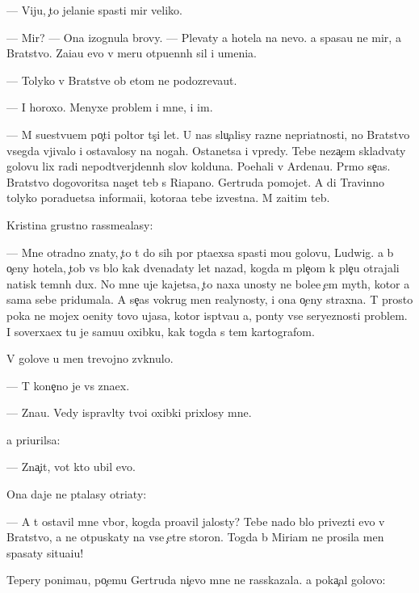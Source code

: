 \documentclass[10pt]{book}
\begin{document}
— Viju, {\c}to jelani{\y}e spasti mir veliko.

— Mir? — Ona izognula brovy. — Plevaty {\y}a hotela na nevo. {\Y}a spasa{\y}u ne mir, a Bratstvo. Za{\x}i{\x}a{\y}u {\y}evo v meru otpu{\x}enn{\yi}h sil i umeni{\y}a.

— Tolyko v Bratstve ob etom ne podozreva{\y}ut.

— I horoxo. Menyxe problem i mne, i im.

— M{\yi} su{\x}estvu{\y}em po{\c}ti poltor{\yi} t{\yi}s{\ia}{\c}i let. U nas slu{\c}alisy razn{\yi}{\y}e nepri{\y}atnosti, no Bratstvo vsegda v{\yi}jivalo i ostavalosy na nogah. Ostanetsa i vpredy. Tebe neza{\c}em sklad{\yi}vaty golovu lix radi nepodtverjdenn{\yi}h slov kolduna. Po{\y}ehali v Ardenau. Pr{\ia}mo se{\y}{\c}as. Bratstvo dogovoritsa nas{\c}et teb{\ia} s Riapano. Gertruda pomojet. A di Travinno tolyko poradu{\y}etsa informa{\q}i{\y}i, kotora{\y}a tebe izvestna. M{\yi} za{\x}itim teb{\ia}.

Kristina grustno rassme{\y}alasy:

— Mne otradno znaty, {\c}to t{\yi} do sih por p{\yi}ta{\y}exsa spasti mo{\y}u golovu, Ludwig. {\Y}a b{\yi} o{\c}eny hotela, {\c}tob{\yi} vs{\e} b{\yi}lo kak dvenad{\q}aty let nazad, kogda m{\yi} ple{\c}om k ple{\c}u otrajali natisk temn{\yi}h dux. No mne uje kajetsa, {\c}to naxa {\y}unosty ne bole{\y}e {\c}em myth, kotor{\yi}{\y} {\y}a sama sebe pridumala. A se{\y}{\c}as vokrug men{\ia} realynosty, i ona o{\c}eny straxna. T{\yi} prosto poka ne mojex o{\q}enity tovo ujasa, kotor{\yi}{\y} isp{\yi}t{\yi}va{\y}u {\y}a, pon{\ia}ty vse{\y} seryeznosti problem{\yi}. I soverxa{\y}ex tu je samu{\y}u oxibku, kak togda s tem kartografom.

V golove u men{\ia} trevojno zv{\ia}knulo.

— T{\yi} kone{\c}no je vs{\e} zna{\y}ex.

— Zna{\y}u. Vedy ispravl{\ia}ty tvo{\y}i oxibki prixlosy mne.

{\Y}a pri{\x}urilsa:

— Zna{\c}it, vot kto ubil {\y}evo.

Ona daje ne p{\yi}talasy otri{\q}aty:

— A t{\yi} ostavil mne v{\yi}bor, kogda pro{\y}avil jalosty? Tebe nado b{\yi}lo privezti {\y}evo v Bratstvo, a ne otpuskaty na vse {\c}et{\yi}re storon{\yi}. Togda b{\yi} Miriam ne prosila men{\ia} spasaty situa{\q}i{\y}u!

Tepery ponima{\y}u, po{\c}emu Gertruda ni{\c}evo mne ne rasskazala. {\Y}a poka{\c}al golovo{\y}:
\end{document}
